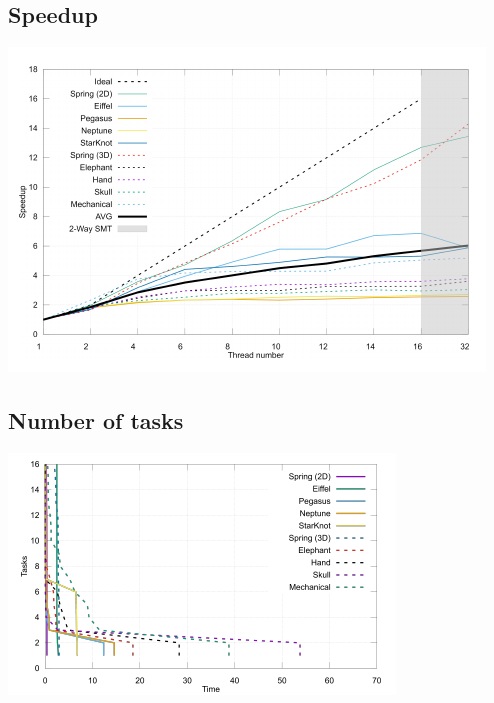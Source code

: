 \documentclass[10pt]{beamer}
\begin{document}
\subsection*{Speedup}
\begin{frame*}
\includegraphics[width=\textwidth]{graph-speedup}
\end{frame*}

\subsection*{Number of tasks}
\begin{frame*}
\includegraphics[width=\textwidth]{graph-tasks}
\end{frame*}
\end{document}
